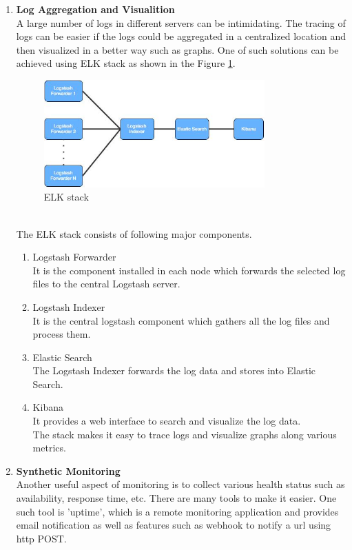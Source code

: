 \begin{enumerate}
\item \textbf{Log Aggregation and Visualition} \\
A large number of logs in different servers can be intimidating. The tracing of logs can be easier if the logs could be aggregated in a centralized location and then visualized in a better way such as graphs. One of such solutions can be achieved using ELK stack as shown in the Figure \ref{fig:challanges_of_microservices_architecture/elk_stack}. \cite{Anicas:2014aa} \cite{Newman:2015aa}
\begin{figure}[H]
\begin{center}
\includegraphics[width=0.8\textwidth]{figures/challenges_four_elk_stack}
\caption{ELK stack}
\label{fig:challanges_of_microservices_architecture/elk_stack}
\end{center}
\end{figure}
\\
The ELK stack consists of following major components.
\begin{enumerate}
\item Logstash Forwarder \\ It is the component installed in each node which forwards the selected log files to the central Logstash server.
\item Logstash Indexer \\ It is the central logstash component which gathers all the log files and process them.
\item Elastic Search \\ The Logstash Indexer forwards the log data and stores into Elastic Search.
\item Kibana \\ It provides a web interface to search and visualize the log data.\\
The stack makes it easy to trace logs and visualize graphs along various metrics.
\end{enumerate}
\item \textbf{Synthetic Monitoring} \\ Another useful aspect of monitoring is to collect various health status such as availability, response time, etc. There are many tools to make it easier. One such tool is 'uptime', which is a remote monitoring application and provides email notification as well as features such as webhook to notify a url using http POST.

\end{enumerate}
